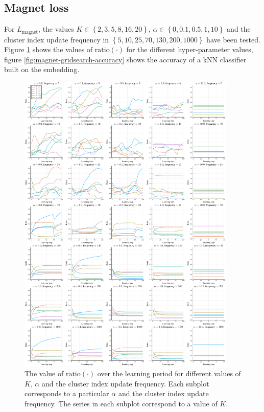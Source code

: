 \subsection{Magnet loss}
For \( L_\mathrm{magnet} \), the values \( K \in \left\{ 2, 3, 5, 8, 16, 20 \right\} \), \( \alpha \in \left\{ 0, 0.1, 0.5, 1, 10 \right\} \) and the cluster index update frequency in \( \left\{ 5, 10, 25, 70, 130, 200, 1000 \right\} \) have been tested. Figure \ref{fig:magnet-gridsearch-ratio} shows the values of \( \mathrm{ratio} \left( \cdot \right) \) for the different hyper-parameter values, figure \ref{fig:magnet-gridsearch-accuracy} shows the accuracy of a kNN classifier built on the embedding.

\begin{figure}[h]
  \centering
  \includegraphics[width=0.93\textwidth]{images/magnet-gridsearch/ratio/K/magnet-gridsearch-ratio-K.pdf}
  \caption{The value of \( \mathrm{ratio} \left( \cdot \right) \) over the learning period for different values of \( K \), \( \alpha \) and the cluster index update frequency. Each subplot corresponds to a particular \( \alpha \) and the cluster index update frequency. The series in each subplot correspond to a value of \( K \).}\label{fig:magnet-gridsearch-ratio}
\end{figure}

